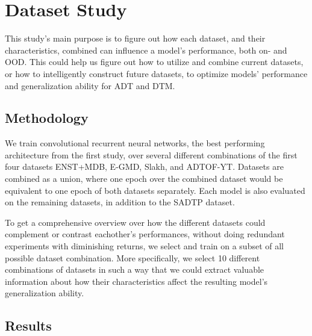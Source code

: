\chapter{Dataset Study}

This study's main purpose is to figure out how each dataset, and their characteristics, combined can influence a model's performance, both on- and \gls{OOD}. This could help us figure out how to utilize and combine current datasets, or how to intelligently construct future datasets, to optimize models' performance and generalization ability for \acrfull{ADT} and \acrfull{DTM}.

\section{Methodology}

We train convolutional recurrent neural networks, the best performing architecture from the first study, over several different combinations of the first four datasets ENST+MDB, E-GMD, Slakh, and ADTOF-YT. Datasets are combined as a union, where one epoch over the combined dataset would be equivalent to one epoch of both datasets separately. Each model is also evaluated on the remaining datasets, in addition to the SADTP dataset.

To get a comprehensive overview over how the different datasets could complement or contrast eachother's performances, without doing redundant experiments with diminishing returns, we select and train on a subset of all possible dataset combination. More specifically, we select 10 different combinations of datasets in such a way that we could extract valuable information about how their characteristics affect the resulting model's generalization ability.

\section{Results}

